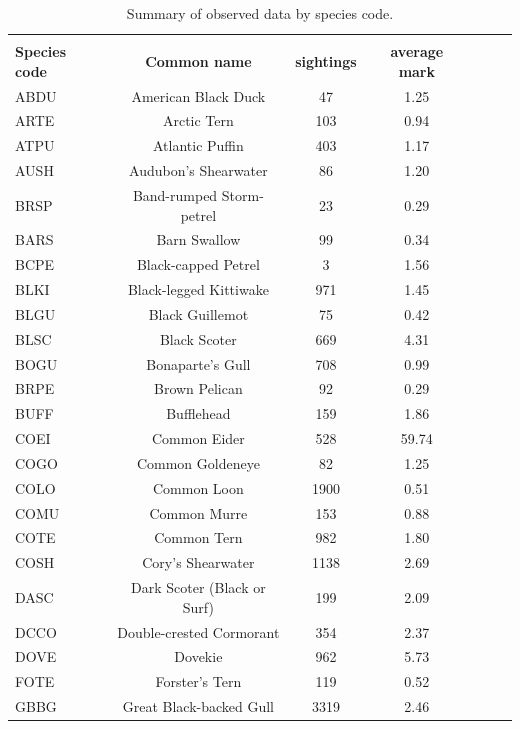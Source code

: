 \documentclass{statsoc}
\begin{document}
{\scriptsize
\begin{longtable}{| l | c | c | c | c | c | c | }
\caption{Summary of observed data by species code.}
\label{tab:species}\\
\hline
  &   &  &   &   &   &  \\ 
\textbf{Species code}  & \textbf{Common name}  & \textbf{sightings}  &\textbf{average mark}  &\textbf{}  &\textbf{}  &\textbf{}   \\ 
\hline
ABDU &  American Black Duck & 47 & 1.25 &  &  &  \\ 
ARTE &  Arctic Tern & 103 & 0.94 &  &   &  \\ 
ATPU &  Atlantic Puffin & 403 & 1.17 &   &  &  \\ 
AUSH &  Audubon's Shearwater & 86 & 1.20 &   &  &  \\ 
BRSP &  Band-rumped Storm-petrel & 23   & 0.29 &  &  &  \\ 
BARS &  Barn Swallow & 99 & 0.34 &  &  &    \\ 
BCPE &  Black-capped Petrel & 3 & 1.56  &    &  &  \\ 
BLKI &  Black-legged Kittiwake & 971 & 1.45 &  &  &  \\ 
BLGU &  Black Guillemot & 75 & 0.42  &  &  &  \\ 
BLSC &  Black Scoter & 669 & 4.31 &  &   &  \\ 
BOGU &  Bonaparte's Gull & 708 & 0.99 &  &   &  \\ 
BRPE &  Brown Pelican & 92 & 0.29 &  &  &   \\ 
BUFF &  Bufflehead & 159 & 1.86 &  &  &  \\ 
COEI &  Common Eider & 528 & 59.74 &  &    &  \\ 
COGO &  Common Goldeneye & 82 & 1.25 &    &  &  \\ 
COLO &  Common Loon & 1900 & 0.51 &   &  &  \\ 
COMU &  Common Murre & 153 & 0.88  &   &  &  \\ 
COTE &  Common Tern & 982 & 1.80 &  &   &  \\ 
COSH &  Cory's Shearwater & 1138 & 2.69 &  &  &  \\ 
DASC &  Dark Scoter (Black or Surf) & 199 & 2.09 &  &  &   \\ 
DCCO &  Double-crested Cormorant & 354 & 2.37 &  &  &  \\ 
DOVE &  Dovekie & 962 & 5.73 &  &  &    \\ 
FOTE &  Forster's Tern & 119 & 0.52 &  &    &  \\ 
GBBG &  Great Black-backed Gull & 3319 & 2.46  &  &   &  \\ 

\end{longtable}}
\end{document}
